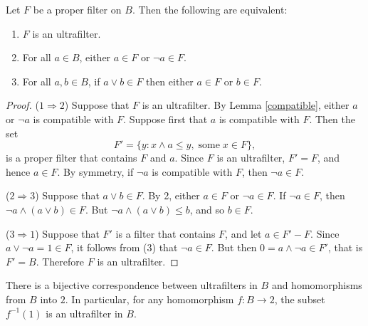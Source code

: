 \begin{prop} Let $F$ be a proper filter on $B$.  Then the following
  are equivalent:
\begin{enumerate}
\item $F$ is an ultrafilter.
\item For all $a\in B$, either $a\in F$ or $\neg a\in F$.
\item For all $a,b\in B$, if $a\vee b\in F$ then either $a\in F$ or
  $b\in F$. \end{enumerate} \end{prop}

\begin{proof} ($1\Rightarrow 2$) Suppose that $F$ is an ultrafilter.
  By Lemma \ref{compatible}, either $a$ or $\neg a$ is compatible with
  $F$.  Suppose first that $a$ is compatible with $F$.  Then the set  
$$ F'=\{ y : x\wedge a\leq y ,\;\text{some}\; x\in F \} ,$$
is a proper filter that contains $F$ and $a$.  Since $F$ is an
ultrafilter, $F'=F$, and hence $a\in F$.  By symmetry, if $\neg a$ is
compatible with $F$, then $\neg a\in F$.

\bigskip ($2\Rightarrow 3$) Suppose that $a\vee b\in F$.  By 2, either
$a\in F$ or $\neg a\in F$.  If $\neg a\in F$, then $\neg a\wedge
(a\vee b)\in F$.  But $\neg a\wedge (a\vee b) \leq b$, and so $b\in
F$.

\bigskip ($3\Rightarrow 1$) Suppose that $F'$ is a filter that
contains $F$, and let $a\in F'-F$.  Since $a\vee \neg a=1\in F$, it
follows from (3) that $\neg a\in F$.  But then $0=a\wedge \neg a\in
F'$, that is $F'=B$.  Therefore $F$ is an ultrafilter.
\end{proof}





\begin{prop} There is a bijective correspondence between ultrafilters
  in $B$ and homomorphisms from $B$ into $2$.  In particular, for any
  homomorphism $f:B\to 2$, the subset $f^{-1}(1)$ is an ultrafilter in
  $B$.  \end{prop}

